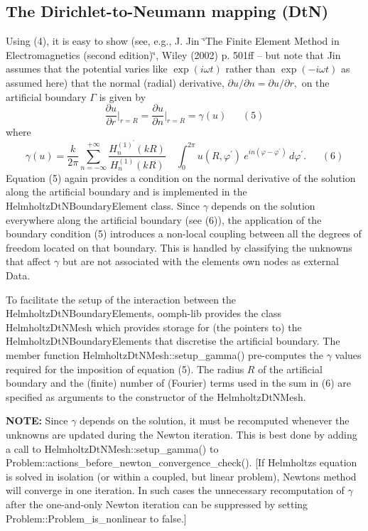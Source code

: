 \hypertarget{index_DtN}{}\subsection{The Dirichlet-\/to-\/\+Neumann mapping (\+Dt\+N)}\label{index_DtN}
Using (4), it is easy to show (see, e.\+g., J. Jin \char`\"{}\+The Finite Element Method in Electromagnetics (second
edition)\char`\"{}, Wiley (2002) p. 501ff -- but note that Jin assumes that the potential varies like $ \exp(i\omega t)$ rather than $ \exp(-i\omega t)$ as assumed here) that the normal (radial) derivative, $ \partial u / \partial n = \partial u / \partial r, $ on the artificial boundary $ \Gamma $ is given by \[ \frac {\partial u}{\partial r}\bigg|_{r=R} = \frac {\partial u}{\partial n}\bigg|_{r=R} = \gamma (u) \ \ \ \ \ \ \ (5) \] where \[ \gamma (u) = \frac {k}{2 \pi} \sum_{n=-\infty}^{+\infty} \frac {H_n^{(1)^{'}}(kR)}{H_n^{(1)}(kR)} \quad \int_0^{2\pi}u(R,\varphi^{'}) \ e^{in(\varphi-\varphi^{'})} \,d\varphi^{'}. \ \ \ \ \ \ \ (6) \] Equation (5) again provides a condition on the normal derivative of the solution along the artificial boundary and is implemented in the {\ttfamily Helmholtz\+Dt\+N\+Boundary\+Element} class. Since $ \gamma $ depends on the solution everywhere along the artificial boundary (see (6)), the application of the boundary condition (5) introduces a non-\/local coupling between all the degrees of freedom located on that boundary. This is handled by classifying the unknowns that affect $ \gamma $ but are not associated with the element\textquotesingle{}s own nodes as external {\ttfamily Data}.

To facilitate the setup of the interaction between the {\ttfamily Helmholtz\+Dt\+N\+Boundary\+Elements}, {\ttfamily oomph-\/lib} provides the class {\ttfamily Helmholtz\+Dt\+N\+Mesh} which provides storage for (the pointers to) the {\ttfamily Helmholtz\+Dt\+N\+Boundary\+Elements} that discretise the artificial boundary. The member function {\ttfamily Helmholtz\+Dt\+N\+Mesh\+::setup\+\_\+gamma()} pre-\/computes the $ \gamma $ values required for the imposition of equation (5). The radius $ R $ of the artificial boundary and the (finite) number of (Fourier) terms used in the sum in (6) are specified as arguments to the constructor of the {\ttfamily Helmholtz\+Dt\+N\+Mesh}.

{\bfseries N\+O\+TE\+:} Since $ \gamma $ depends on the solution, it must be recomputed whenever the unknowns are updated during the Newton iteration. This is best done by adding a call to {\ttfamily Helmholtz\+Dt\+N\+Mesh\+::setup\+\_\+gamma()} to {\ttfamily Problem\+::actions\+\_\+before\+\_\+newton\+\_\+convergence\+\_\+check()}. \mbox{[}If Helmholtz\textquotesingle{}s equation is solved in isolation (or within a coupled, but linear problem), Newton\textquotesingle{}s method will converge in one iteration. In such cases the unnecessary recomputation of $ \gamma $ after the one-\/and-\/only Newton iteration can be suppressed by setting {\ttfamily Problem\+::\+Problem\+\_\+is\+\_\+nonlinear} to {\ttfamily false}.\mbox{]}



